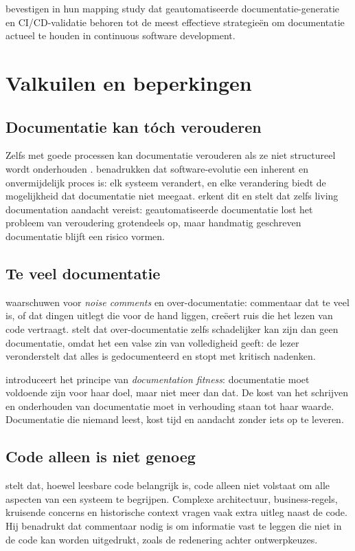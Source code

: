 \textcite{theunissen2022mappingdocumentation} bevestigen in hun mapping study dat geautomatiseerde documentatie-generatie en CI/CD-validatie behoren tot de meest effectieve strategieën om documentatie actueel te houden in continuous software development.

\section{Valkuilen en beperkingen}
\label{sec:cad-valkuilen}

\subsection{Documentatie kan tóch verouderen}
Zelfs met goede processen kan documentatie verouderen als ze niet structureel wordt onderhouden \autocite{tripathy2014softwareevolution}. \textcite{tripathy2014softwareevolution} benadrukken dat software-evolutie een inherent en onvermijdelijk proces is: elk systeem verandert, en elke verandering biedt de mogelijkheid dat documentatie niet meegaat. \textcite{martraire2019livingdocumentation} erkent dit en stelt dat zelfs living documentation aandacht vereist: geautomatiseerde documentatie lost het probleem van veroudering grotendeels op, maar handmatig geschreven documentatie blijft een risico vormen.

\subsection{Te veel documentatie}
\textcite{boswell2011readablecode} waarschuwen voor \textit{noise comments} en over-documentatie: commentaar dat te veel is, of dat dingen uitlegt die voor de hand liggen, creëert ruis die het lezen van code vertraagt. \textcite{martin2008clean} stelt dat over-documentatie zelfs schadelijker kan zijn dan geen documentatie, omdat het een valse zin van volledigheid geeft: de lezer veronderstelt dat alles is gedocumenteerd en stopt met kritisch nadenken.

\textcite{ruping2005agiledocumentation} introduceert het principe van \textit{documentation fitness}: documentatie moet voldoende zijn voor haar doel, maar niet meer dan dat. De kost van het schrijven en onderhouden van documentatie moet in verhouding staan tot haar waarde. Documentatie die niemand leest, kost tijd en aandacht zonder iets op te leveren.

\subsection{Code alleen is niet genoeg}
\textcite{ousterhout2018philosophy} stelt dat, hoewel leesbare code belangrijk is, code alleen niet volstaat om alle aspecten van een systeem te begrijpen. Complexe architectuur, business-regels, kruisende concerns en historische context vragen vaak extra uitleg naast de code. Hij benadrukt dat commentaar nodig is om informatie vast te leggen die niet in de code kan worden uitgedrukt, zoals de redenering achter ontwerpkeuzes.

